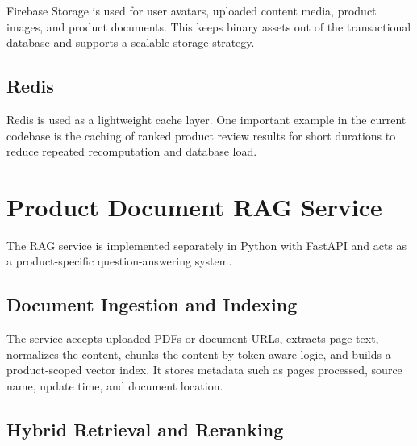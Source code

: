 \documentclass[12pt,letterpaper]{report}
\begin{document}
Firebase Storage is used for user avatars, uploaded content media, product images, and product documents. This keeps binary assets out of the transactional database and supports a scalable storage strategy.


\subsection{Redis}

Redis is used as a lightweight cache layer. One important example in the current codebase is the caching of ranked product review results for short durations to reduce repeated recomputation and database load.

\section{Product Document RAG Service}

The RAG service is implemented separately in Python with FastAPI and acts as a product-specific question-answering system.

\subsection{Document Ingestion and Indexing}

The service accepts uploaded PDFs or document URLs, extracts page text, normalizes the content, chunks the content by token-aware logic, and builds a product-scoped vector index. It stores metadata such as pages processed, source name, update time, and document location.


\subsection{Hybrid Retrieval and Reranking}
\end{document}
